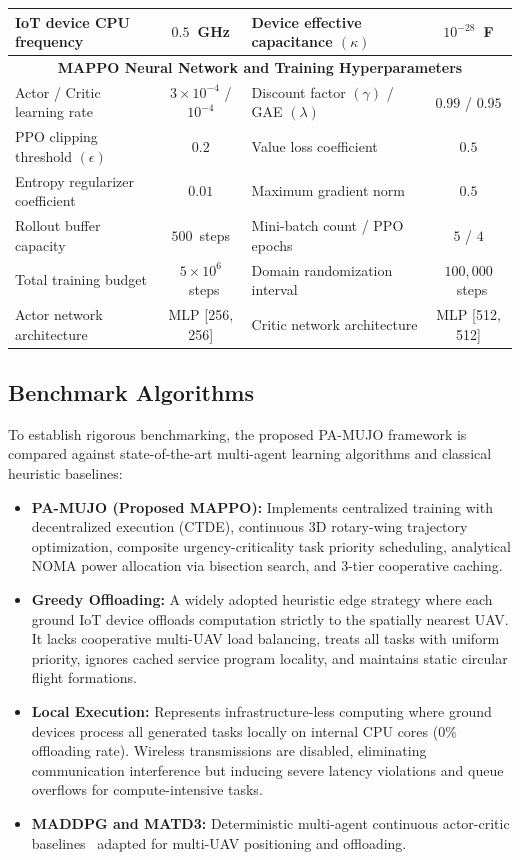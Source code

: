 \documentclass[journal]{IEEEtran}
\begin{document}
\begin{table}[!ht]
{\begin{tabular}{|l|c|l|c|}
IoT device CPU frequency & $0.5$~GHz & Device effective capacitance $(\kappa)$ & $10^{-28}$~F \\ \hline
\multicolumn{4}{|c|}{\cellcolor{blue!8}\textbf{MAPPO Neural Network and Training Hyperparameters}} \\ \hline
Actor / Critic learning rate & $3{\times}10^{-4}$ / $10^{-4}$ & Discount factor $(\gamma)$ / GAE $(\lambda)$ & $0.99$ / $0.95$ \\ \hline
PPO clipping threshold $(\epsilon)$ & $0.2$ & Value loss coefficient & $0.5$ \\ \hline
Entropy regularizer coefficient & $0.01$ & Maximum gradient norm & $0.5$ \\ \hline
Rollout buffer capacity & $500$~steps & Mini-batch count / PPO epochs & $5$ / $4$ \\ \hline
Total training budget & $5 \times 10^6$~steps & Domain randomization interval & $100{,}000$~steps \\ \hline
Actor network architecture & MLP [256, 256] & Critic network architecture & MLP [512, 512] \\ \hline
\end{tabular}}
\end{table}

\subsection{Benchmark Algorithms}
To establish rigorous benchmarking, the proposed PA-MUJO framework is compared against state-of-the-art multi-agent learning algorithms and classical heuristic baselines:
\begin{itemize}
    \item \textbf{PA-MUJO (Proposed MAPPO):} Implements centralized training with decentralized execution (CTDE), continuous 3D rotary-wing trajectory optimization, composite urgency-criticality task priority scheduling, analytical NOMA power allocation via bisection search, and 3-tier cooperative caching.
    \item \textbf{Greedy Offloading:} A widely adopted heuristic edge strategy where each ground IoT device offloads computation strictly to the spatially nearest UAV. It lacks cooperative multi-UAV load balancing, treats all tasks with uniform priority, ignores cached service program locality, and maintains static circular flight formations.
    \item \textbf{Local Execution:} Represents infrastructure-less computing where ground devices process all generated tasks locally on internal CPU cores ($0\%$ offloading rate). Wireless transmissions are disabled, eliminating communication interference but inducing severe latency violations and queue overflows for compute-intensive tasks.
    \item \textbf{MADDPG and MATD3:} Deterministic multi-agent continuous actor-critic baselines~\cite{ddpg, 11440830} adapted for multi-UAV positioning and offloading.
\end{itemize}
\end{document}
